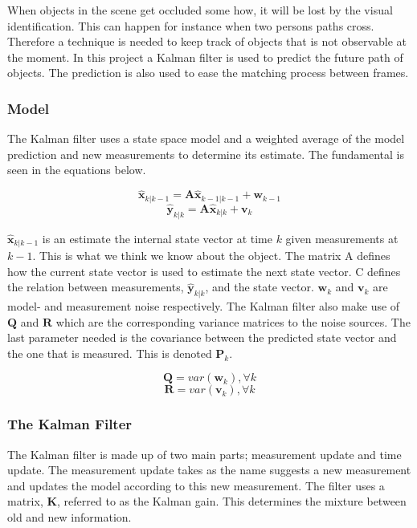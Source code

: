 When objects in the scene get occluded some how, it will be lost by the visual identification. This can happen for instance when two persons paths cross. Therefore a technique is needed to keep track of objects that is not observable at the moment. In this project a Kalman filter is used to predict the future path of objects. The prediction is also used to ease the matching process between frames. 

\subsubsection{Model}
The Kalman filter uses a state space model and a weighted average of the model prediction and new measurements to determine its estimate. The fundamental is seen in the equations below.


\begin{equation}
\label{}
\hat{\textbf{x}}_{k|k-1} = \textbf{A}\hat{\textbf{x}}_{k-1|k-1} +  \textbf{w}_{k-1}  
\end{equation}
\begin{equation}
\label{}
\hat{\textbf{y}}_{k|k} = \textbf{A}\hat{\textbf{x}}_{k|k} +  \textbf{v}_{k}
\end{equation}
	
$\hat{\textbf{x}}_{k|k-1}$ is an estimate the internal state vector at time $k$ given measurements at $k-1$. This is what we think we know about the object. The matrix A defines how the current state vector is used to estimate the next state vector. C defines the relation between measurements, $\hat{\textbf{y}}_{k|k}$, and the state vector. $\textbf{w}_{k}$ and $\textbf{v}_{k}$ are model- and measurement noise respectively. The Kalman filter also make use of $\textbf{Q}$ and $\textbf{R}$ which are the corresponding variance matrices to the noise sources. The last parameter needed is the covariance between the predicted state vector and the one that is measured. This is denoted $\textbf{P}_{k}$.

\begin{equation}
\label{}
\textbf{Q} = var(\textbf{w}_k), \forall k
\end{equation}
\begin{equation}
\label{}
\textbf{R} = var(\textbf{v}_k), \forall k
\end{equation}



\subsubsection{The Kalman Filter}
The Kalman filter is made up of two main parts; measurement update and time update. The measurement update takes as the name suggests a new measurement and updates the model according to this new measurement. The filter uses a matrix, $\textbf{K}$, referred to as the Kalman gain. This determines the mixture between old and new information.

